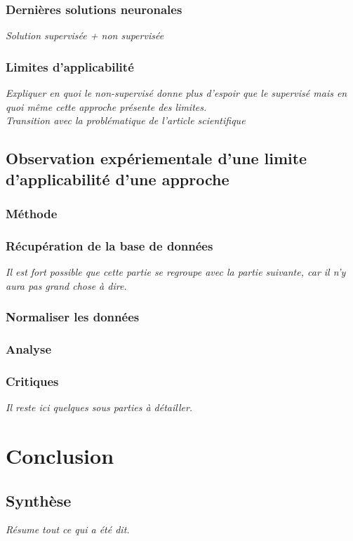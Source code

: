 \documentclass[12pt, french]{report}
\begin{document}
\subsection{Dernières solutions neuronales}
\textit{Solution supervisée + non supervisée}

\subsection{Limites d'applicabilité}
\textit{Expliquer en quoi le non-supervisé donne plus d'espoir que le supervisé mais en quoi même cette approche présente des limites.}\\
\textit{Transition avec la problématique de l'article scientifique}\\

\section{Observation expériementale d'une limite d'applicabilité d'une approche}
\subsection{Méthode}
\subsection{Récupération de la base de données}
\textit{Il est fort possible que cette partie se regroupe avec la partie suivante, car il n'y aura pas grand chose à dire.}

\subsection{Normaliser les données}

\subsection{Analyse}
\subsection{Critiques}
\textit{Il reste ici quelques sous parties à détailler.}

\chapter{Conclusion}
\section{Synthèse}
\textit{Résume tout ce qui a été dit.}
\end{document}
